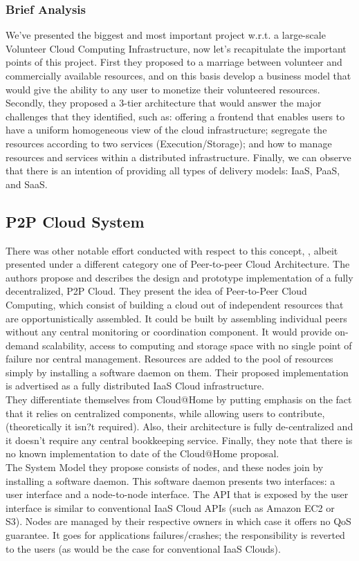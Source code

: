 \documentclass[11pt]{amsart}
\begin{document}
	\subsubsection{Brief Analysis}
	We've presented the biggest and most important project w.r.t. a large-scale Volunteer Cloud Computing 
	Infrastructure, now let's recapitulate the important points of this project. First they proposed to 
	a marriage between volunteer and commercially available resources, and on this basis develop a 
	business model that would give the ability to any user to monetize their volunteered resources. 
	Secondly, they proposed a 3-tier architecture that would answer the major challenges that they 
	identified, such as: offering a frontend that enables users to have a uniform homogeneous view 
	of the cloud infrastructure; segregate the resources according to two services (Execution/Storage);
	and how to manage resources and services within a distributed infrastructure. Finally, we can observe 
	that there is an intention of providing all types of delivery models: IaaS, PaaS, and SaaS.
	
	
	\subsection{P2P Cloud System}
	There was other notable effort conducted with respect to this concept, \cite{P2PCS}, albeit presented 
	under a different category one of Peer-to-peer Cloud Architecture. The authors propose and describes 
	the design and prototype implementation of a fully decentralized, P2P Cloud. They present the idea of 
	Peer-to-Peer Cloud Computing, which consist of building a cloud out of independent resources that are 
	opportunistically assembled. It could be built by assembling individual peers without any central 
	monitoring or coordination component. It would provide on-demand scalability, access to computing and 
	storage space with no single point of failure nor central management. Resources are added to the pool 
	of resources simply by installing a software daemon on them. Their proposed implementation is 
	advertised as a fully distributed IaaS Cloud infrastructure.
	\\
	They differentiate themselves from Cloud@Home by putting emphasis on the fact that it relies on centralized 
	components, while allowing users to contribute, (theoretically it isn?t required). Also, their architecture 
	is fully de-centralized and it doesn't require any central bookkeeping service. Finally, they note that there 
	is no known implementation to date of the Cloud@Home proposal.
	\\
	The System Model they propose consists of nodes, and these nodes join by installing a software daemon. 
	This software daemon presents two interfaces: a user interface and a node-to-node interface. The API 
	that is exposed by the user interface is similar to conventional IaaS Cloud APIs (such as Amazon EC2 or S3). 
	Nodes are managed by their respective owners in which case it offers no QoS guarantee. It goes for 
	applications failures/crashes; the responsibility is reverted to the users (as would be the case for 
	conventional IaaS Clouds).
	
\end{document}
